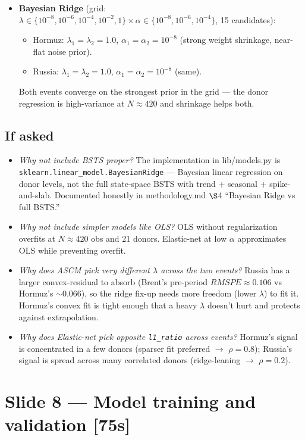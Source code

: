 \documentclass[11pt,a4paper]{article}
\newcommand{\timetag}[1]{\hfill\textcolor{muted}{\small[#1]}}
\begin{document}
\begin{itemize}
  \item \textbf{Bayesian Ridge} (grid: $\lambda \in \{10^{-8}, 10^{-6}, 10^{-4}, 10^{-2}, 1\} \times \alpha \in \{10^{-8}, 10^{-6}, 10^{-4}\}$, 15 candidates):
  \begin{itemize}
    \item Hormuz: $\lambda_1=\lambda_2=1.0$, $\alpha_1=\alpha_2=10^{-8}$ (strong weight shrinkage, near-flat noise prior).
    \item Russia:  $\lambda_1=\lambda_2=1.0$, $\alpha_1=\alpha_2=10^{-8}$ (same).
  \end{itemize}
  Both events converge on the strongest prior in the grid --- the donor regression is high-variance at $N \approx 420$ and shrinkage helps both.
\end{itemize}

\subsection{If asked}
\begin{itemize}
  \item \textit{Why not include BSTS proper?} The implementation in lib/models.py is \texttt{sklearn.linear\_model.BayesianRidge} --- Bayesian linear regression on donor levels, not the full state-space BSTS with trend + seasonal + spike-and-slab. Documented honestly in methodology.md $\S$4 ``Bayesian Ridge vs full BSTS.''
  \item \textit{Why not include simpler models like OLS?} OLS without regularization overfits at $N \approx 420$ obs and 21 donors. Elastic-net at low $\alpha$ approximates OLS while preventing overfit.
  \item \textit{Why does ASCM pick very different $\lambda$ across the two events?} Russia has a larger convex-residual to absorb (Brent's pre-period $RMSPE \approx 0.106$ vs Hormuz's $\sim$0.066), so the ridge fix-up needs more freedom (lower $\lambda$) to fit it. Hormuz's convex fit is tight enough that a heavy $\lambda$ doesn't hurt and protects against extrapolation.
  \item \textit{Why does Elastic-net pick opposite \texttt{l1\_ratio} across events?} Hormuz's signal is concentrated in a few donors (sparser fit preferred $\to$ $\rho{=}0.8$); Russia's signal is spread across many correlated donors (ridge-leaning $\to$ $\rho{=}0.2$).
\end{itemize}

\section{Slide 8 --- Model training and validation \timetag{75s}}
\end{document}
